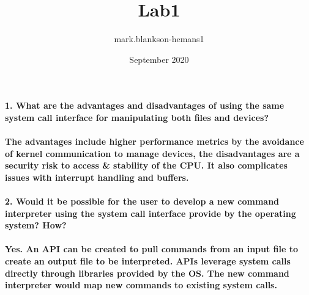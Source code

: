 \documentclass{article}
\title{Lab1}
\author{mark.blankson-hemans1 }
\date{September 2020}
\begin{document}
\paragraph{1. What are the advantages and disadvantages of using the same system call interface for manipulating both files and devices?}

\paragraph{The advantages include higher performance metrics by the avoidance of kernel communication to manage devices, the disadvantages are a security risk to access & stability of the CPU. It also complicates issues with interrupt handling and buffers.}

\paragraph{
2. Would it be possible for the user to develop a new command interpreter using the system call interface provide by the operating system? How?}

\paragraph{Yes. An API can be created to pull commands from an input file to create an output file to be interpreted. APIs leverage system calls directly through libraries provided by the OS. The new command interpreter would map new commands to existing system calls.}
\end{document}
